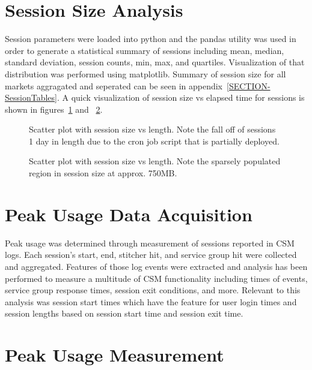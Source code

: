 \documentclass{article}
\begin{document}
\section{Session Size Analysis}

Session parameters were loaded into python and the pandas utility was used in order to generate a statistical summary of sessions including mean, median, standard deviation, session counts, min, max, and quartiles. Visualization of that distribution was performed using matplotlib. Summary of session size for all markets aggragated and seperated can be seen in appendix~\ref{SECTION-SessionTables}. A quick visualization of session size vs elapsed time for sessions is shown in figures~\ref{FIGURE-SizeVsLenth} and ~\ref{FIGURE-SizeVsLengthZoomed}. 

\begin{figure}[!htb]
        \caption{\label{FIGURE-SizeVsLenth} Scatter plot with session size vs length. Note the fall off of sessions $\>$ 1 day in length due to the cron job script that is partially deployed.}
\end{figure}

\begin{figure}[!htb]
        \caption{\label{FIGURE-SizeVsLengthZoomed} Scatter plot with session size vs length. Note the sparsely populated region in session size at approx. 750MB.}
\end{figure}



\section{Peak Usage Data Acquisition}

Peak usage was determined through measurement of sessions reported in CSM logs. Each session's start, end, stitcher hit, and service group hit were collected and aggregated. Features of those log events were extracted and analysis has been performed to measure a multitude of CSM functionality including times of events, service group response times, session exit conditions, and more. Relevant to this analysis was session start times which have the feature for user login times and session lengths based on session start time and session exit time. 



\section{Peak Usage Measurement}
\end{document}
